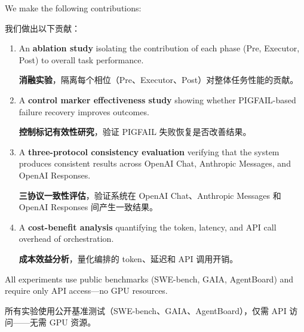 We make the following contributions:
\begin{chinese}
我们做出以下贡献：
\end{chinese}
\begin{enumerate}
    \item An \textbf{ablation study} isolating the contribution of each phase (Pre, Executor, Post) to overall task performance.
    \begin{chinese}
    \textbf{消融实验}，隔离每个相位（Pre、Executor、Post）对整体任务性能的贡献。
    \end{chinese}
    \item A \textbf{control marker effectiveness study} showing whether PIGFAIL-based failure recovery improves outcomes.
    \begin{chinese}
    \textbf{控制标记有效性研究}，验证 PIGFAIL 失败恢复是否改善结果。
    \end{chinese}
    \item A \textbf{three-protocol consistency evaluation} verifying that the system produces consistent results across OpenAI Chat, Anthropic Messages, and OpenAI Responses.
    \begin{chinese}
    \textbf{三协议一致性评估}，验证系统在 OpenAI Chat、Anthropic Messages 和 OpenAI Responses 间产生一致结果。
    \end{chinese}
    \item A \textbf{cost-benefit analysis} quantifying the token, latency, and API call overhead of orchestration.
    \begin{chinese}
    \textbf{成本效益分析}，量化编排的 token、延迟和 API 调用开销。
    \end{chinese}
\end{enumerate}

All experiments use public benchmarks (SWE-bench, GAIA, AgentBoard) and require only API access---no GPU resources.
\begin{chinese}
所有实验使用公开基准测试（SWE-bench、GAIA、AgentBoard），仅需 API 访问——无需 GPU 资源。
\end{chinese}
